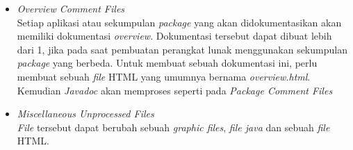 \begin{itemize}
	\begin{lstlisting}[language=Java, caption={\it File} package-info.java, label={package-info}]
	/**
	 * Provides the classes necessary to create an applet
	 * and the classes an applet uses to communicate
	 * with its applet context.
	 *
	 * @since 1.0
	 * @see java.awt
	 */
	 package java.lang.applet;
	\end{lstlisting}
	Ketika {\it Javadoc} memproses {\it package} tersebut, {\it Javadoc} akan melakukan beberapa langkah yaitu sebagai berikut:
	\begin{enumerate}
		\item Menyalin informasi untuk diproses. Jika {\it file} berupa HTML maka pada bagian {\it <body>} hingga {\it </body>} akan disalin.
		\item Memproses semua {\it tag} pada {\it package} yang ada.
		\item Memasukan teks yang sudah diproses tersebut pada bagian bawah halaman dokumentasi yang dihasilkan.
		\item Salin kalimat pertama pada {\it package} tersebut pada bagian atas halaman dokumentasi
	\end{enumerate}
	\item {\it Overview Comment Files}\\
	Setiap aplikasi atau sekumpulan {\it package} yang akan didokumentasikan akan memiliki dokumentasi {\it overview}. Dokumentasi tersebut dapat dibuat lebih dari 1, jika pada saat pembuatan perangkat lunak menggunakan sekumpulan {\it package} yang berbeda. Untuk membuat sebuah dokumentasi ini, perlu membuat sebuah {\it file} HTML yang umumnya bernama {\it overview.html}. Kemudian {\it Javadoc} akan memproses seperti pada {\it Package Comment Files}
	\item {\it Miscellaneous Unprocessed Files}\\
	{\it File} tersebut dapat berubah sebuah {\it graphic files}, {\it file java} dan sebuah {\it file} HTML.
\end{itemize}

